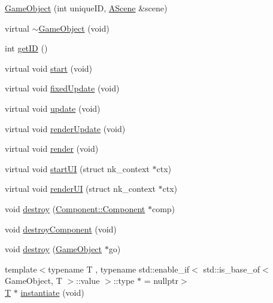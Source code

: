 \begin{DoxyCompactItemize}
\item 
\mbox{\hyperlink{class_beer_engine_1_1_game_object_a4b23814e19c3dabc407594419d396a41}{Game\+Object}} (int unique\+ID, \mbox{\hyperlink{class_beer_engine_1_1_a_scene}{A\+Scene}} \&scene)
\item 
virtual \mbox{\hyperlink{class_beer_engine_1_1_game_object_a7e5c50ce01ec2831aaf489271a77297e}{$\sim$\+Game\+Object}} (void)
\item 
int \mbox{\hyperlink{class_beer_engine_1_1_game_object_a36782b2d17c0e576ab740903c5cfeab0}{get\+ID}} ()
\item 
virtual void \mbox{\hyperlink{class_beer_engine_1_1_game_object_a2caa6e6105c6766fdac3688ff1e74f00}{start}} (void)
\item 
virtual void \mbox{\hyperlink{class_beer_engine_1_1_game_object_a8a27a6cc9c9963366fbae264e4f14f97}{fixed\+Update}} (void)
\item 
virtual void \mbox{\hyperlink{class_beer_engine_1_1_game_object_ab53f4154cb5cecd0b1238465f7d1fc81}{update}} (void)
\item 
virtual void \mbox{\hyperlink{class_beer_engine_1_1_game_object_a3b1a996713890a49cc4c9a7aa014e190}{render\+Update}} (void)
\item 
virtual void \mbox{\hyperlink{class_beer_engine_1_1_game_object_ac74ff77a1e62e76eff1247c4d3daaa33}{render}} (void)
\item 
virtual void \mbox{\hyperlink{class_beer_engine_1_1_game_object_a2913798eee7a983d3e6da0cf78d29752}{start\+UI}} (struct nk\+\_\+context $\ast$ctx)
\item 
virtual void \mbox{\hyperlink{class_beer_engine_1_1_game_object_a41ec8584219fff4d65de2b39e080fff9}{render\+UI}} (struct nk\+\_\+context $\ast$ctx)
\item 
void \mbox{\hyperlink{class_beer_engine_1_1_game_object_a6d05e99954dfbdab2eb2102d71d9a364}{destroy}} (\mbox{\hyperlink{class_beer_engine_1_1_component_1_1_component}{Component\+::\+Component}} $\ast$comp)
\item 
void \mbox{\hyperlink{class_beer_engine_1_1_game_object_affa35f94189065985a5cded85bda7d66}{destroy\+Component}} (void)
\item 
void \mbox{\hyperlink{class_beer_engine_1_1_game_object_a69de7e42efb9e30ce00de85a35121309}{destroy}} (\mbox{\hyperlink{class_beer_engine_1_1_game_object}{Game\+Object}} $\ast$go)
\item 
{\footnotesize template$<$typename T , typename std\+::enable\+\_\+if$<$ std\+::is\+\_\+base\+\_\+of$<$ Game\+Object, T $>$\+::value $>$\+::type $\ast$  = nullptr$>$ }\\\mbox{\hyperlink{namespace_beer_engine_a94f0b552f6dc910de8cdb44207981f53a8de48e594408f9fc561b2f68ce05f664}{T}} $\ast$ \mbox{\hyperlink{class_beer_engine_1_1_game_object_ab88b7ff5e8aab52e54c02f9d103bbfcf}{instantiate}} (void)

\end{DoxyCompactItemize}
